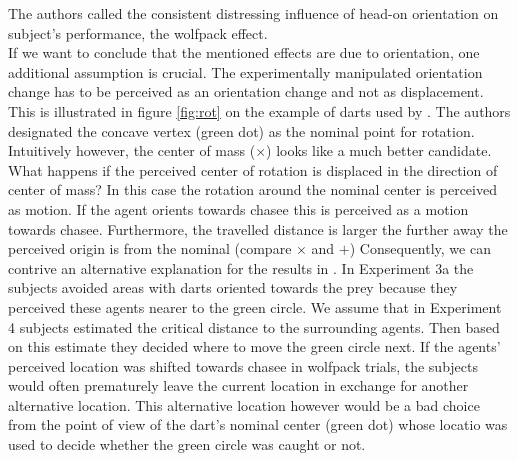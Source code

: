 \documentclass[10pt]{article}
\begin{document}
The authors called the consistent distressing influence of head-on orientation on subject's performance, the wolfpack effect.\\
If we want to conclude that the mentioned effects are due to orientation, one additional assumption is crucial. 
The experimentally manipulated orientation change has to be perceived as an orientation change and not as displacement. 
This is illustrated in figure \ref{fig:rot} on the example of darts used by \cite{gao10}. 
The authors designated the concave vertex (green dot) as the nominal point for rotation. 
Intuitively however, the center of mass ($\times$) looks like a much better candidate. 
What happens if the perceived center of rotation is displaced in the direction of center of mass?
In this case the rotation around the nominal center is perceived as motion. 
If the agent orients towards chasee this is perceived as a motion towards chasee.
Furthermore, the travelled distance is larger the further away the perceived origin is from the nominal (compare $\times$ and $+$) 
Consequently, we can contrive an alternative explanation for the results in \cite{gao10}. 
In Experiment 3a the subjects avoided areas with darts oriented towards the prey because they perceived these agents nearer to the green circle. 
We assume that in Experiment 4 subjects estimated the critical distance to the surrounding agents. 
Then based on this estimate they decided where to move the green circle next. 
If the agents' perceived location was shifted towards chasee in wolfpack trials, the subjects would often prematurely leave the current location in exchange for another alternative location. 
This alternative location however would be a bad choice from the point of view of the dart's nominal center (green dot) whose locatio was used to decide whether the green circle was caught or not. 
\end{document}
